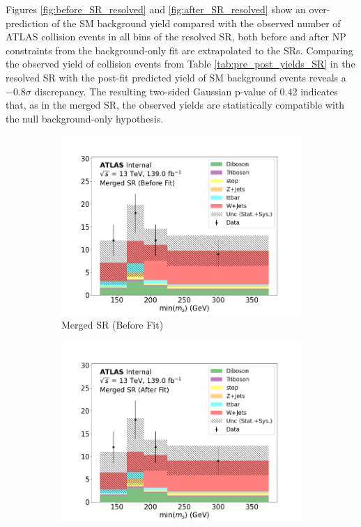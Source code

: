 Figures \ref{fig:before_SR_resolved} and \ref{fig:after_SR_resolved} show an over-prediction of the SM background yield compared with the observed number of ATLAS collision events in all bins of the resolved SR, both before and after NP constraints from the background-only fit are extrapolated to the SRs. Comparing the observed yield of collision events from Table \ref{tab:pre_post_yields_SR} in the resolved SR with the post-fit predicted yield of SM background events reveals a \(-0.8\sigma\) discrepancy. The resulting two-sided Gaussian p-value of 0.42 indicates that, as in the merged SR, the observed yields are statistically compatible with the null background-only hypothesis. 

\begin{figure}[h]
  \centering
  \begin{subfigure}{0.45\textwidth}
    \includegraphics[width=\textwidth]{Figures/8/SR_Merged_before.pdf}
    \caption{Merged SR (Before Fit)}\label{fig:before_SR_merged}
  \end{subfigure} \hspace{1em}
  \begin{subfigure}{0.45\textwidth}
    \includegraphics[width=\textwidth]{Figures/8/SR_Merged_after.pdf}

\end{subfigure}
\end{figure}
